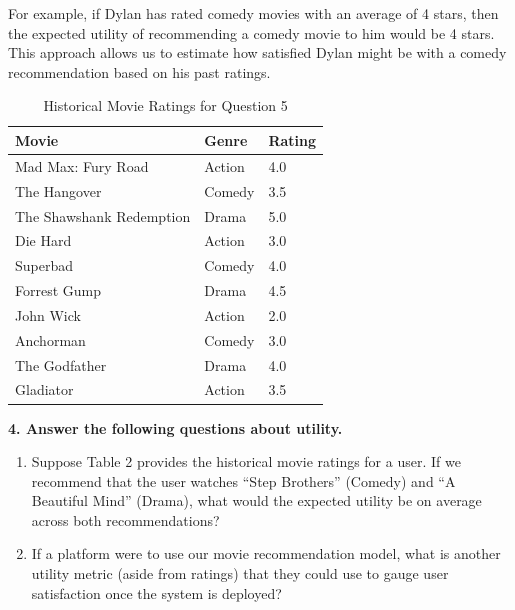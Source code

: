 \documentclass{article}
\begin{document}
For example, if Dylan has rated comedy movies with an average of 4 stars, then the expected utility of recommending a comedy movie to him would be 4 stars. This approach allows us to estimate how satisfied Dylan might be with a comedy recommendation based on his past ratings.





\begin{table}[h]
    \centering
    \caption{Historical Movie Ratings for Question 5}
    \begin{tabular}{lll}
        \toprule
        \textbf{Movie} & \textbf{Genre} & \textbf{Rating} \\
        \midrule
        Mad Max: Fury Road      & Action & 4.0  \\
        The Hangover            & Comedy & 3.5  \\
        The Shawshank Redemption & Drama  & 5.0  \\
        Die Hard                & Action & 3.0  \\
        Superbad                & Comedy & 4.0  \\
        Forrest Gump            & Drama  & 4.5  \\
        John Wick               & Action & 2.0  \\
        Anchorman               & Comedy & 3.0  \\
        The Godfather           & Drama  & 4.0  \\
        Gladiator               & Action & 3.5  \\
        \bottomrule
    \end{tabular}
    \label{tab:movie_ratings}
\end{table}

\textbf{4. Answer the following questions about utility.}
\begin{enumerate}[label=\Alph*.]
\item Suppose Table 2 provides the historical movie ratings for a user. If we recommend that the user watches ``Step Brothers'' (Comedy) and ``A Beautiful Mind'' (Drama), what would the expected utility be on average across both recommendations? 
\item If a platform were to use our movie recommendation model, what is another utility metric (aside from ratings) that they could use to gauge user satisfaction once the system is deployed? 
\end{enumerate}
\end{document}
